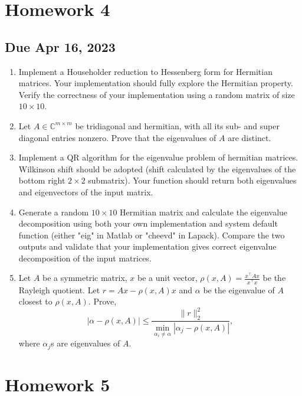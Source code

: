 \section{Homework 4}
\subsection*{Due Apr 16, 2023}
\begin{enumerate}[label=\textbf{Problem \arabic*.}]
    \item [20 pt] Implement a Householder reduction to Hessenberg form for Hermitian matrices. Your implementation should fully explore the Hermitian property. Verify the correctness of your implementation using a random matrix of size \(10\times 10\).
    \item [20 pt] Let \(A\in\mathbb{C}^{m\times m}\) be tridiagonal and hermitian, with all its sub- and super diagonal entries nonzero. Prove that the eigenvalues of \(A\) are distinct.
    \item [40 pt] Implement a QR algorithm for the eigenvalue problem of hermitian matrices. Wilkinson shift should be adopted (shift calculated by the eigenvalues of the bottom right \(2\times 2\) submatrix). Your function should return both eigenvalues and eigenvectors of the input matrix.
    \item [10 pt] Generate a random \(10\times 10\) Hermitian matrix and calculate the eigenvalue decomposition using both your own implementation and system default function (either "eig" in Matlab or "cheevd" in Lapack). Compare the two outputs and validate that your implementation gives correct eigenvalue decomposition of the input matrices.
    \item [30 pt] Let \(A\) be a symmetric matrix, \(x\) be a unit vector, \(\rho(x,A)=\frac{x^{\top}Ax}{x^{\top}x}\) be the Rayleigh quotient. Let \(r=Ax-\rho(x,A)x\) and \(\alpha\) be the eigenvalue of \(A\) closest to \(\rho(x,A)\). Prove,
    \[|\alpha-\rho(x,A)|\leq\frac{\|r\|_{2}^{2}}{\min_{\alpha_{i}\neq\alpha}|\alpha_{j }-\rho(x,A)|},\]
    where \(\alpha_{j}\)s are eigenvalues of \(A\).
\end{enumerate}


\section{Homework 5}
